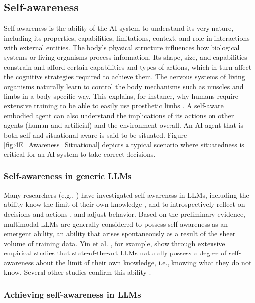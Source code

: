 \documentclass[10pt,journal,compsoc]{IEEEtran}
\begin{document}
	
	
	\subsection{Self-awareness}
	Self-awareness is the ability of the AI system to understand its very nature, including its properties, capabilities, limitations, context, and role in interactions with external entities. The body's physical structure influences how biological systems or living organisms process information. Its shape, size, and capabilities constrain and afford certain capabilities and types of actions, which in turn affect the cognitive strategies required to achieve them. The nervous systems of living organisms naturally learn to control the body mechanisms such as muscles and limbs in a body-specific way. This explains, for instance, why humans require extensive training to be able to easily use prosthetic limbs \cite{windrich2016active,farina2023toward}. A self-aware embodied agent can also understand the implications of its actions on other agents (human and artificial) and the environment overall. An AI agent that is both self-and situational-aware is said to be situated. Figure \ref{fig:4E_Awareness_Situational} depicts a typical scenario where situatedness is critical for an AI system to take correct decisions.
	
	
	\subsubsection{Self-awareness in generic LLMs }
	Many researchers (e.g., \cite{li2024benchmarking,chen2024persona,wang2024mm}) have investigated self-awareness in LLMs, including the ability know the limit of their own knowledge \cite{yin2023large,wang2023survey,prato2024large}, and to introspectively reflect on decisions and actions \cite{qu2024recursive,liang2024introspective,song2024exploreself},  and adjust behavior. Based on the preliminary evidence, multimodal LLMs are generally considered to possess self-awareness as an emergent ability, an ability that arises spontaneously as a result of the sheer volume of training data. Yin et al. \cite{yin2023large}, for example, show through extensive empirical studies that state-of-the-art LLMs naturally possess a degree of self-awareness about the limit of their own knowledge, i.e., knowing what they do not know. Several other studies confirm this ability \cite{wang2023self,laine2024me,davidson2024self,wen2024perception,pushpanathan2023popular}. 
	
	
	\subsubsection{Achieving self-awareness in LLMs}
	
\end{document}
